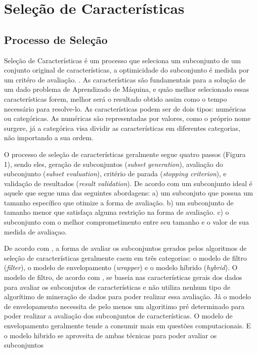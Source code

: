 \chapter[Seleção de Características]{Seleção de Características}

\section{Processo de Seleção}

Seleção de Características é um processo que seleciona um subconjunto de um conjunto original de características, a optimicidade do subconjunto é medida por um critéro de avaliação. \cite{liu_2005}. As características são fundamentais para a solução de um dado problema de Aprendizado de Máquina, e quão melhor selecionado essas características forem, melhor será o resultado obtido assim como o tempo necessário para resolve-lo. As características podem ser de dois tipos: numéricas ou categóricas. As numéricas são representadas por valores, como o próprio nome surgere, já a categórica visa dividir as características em diferentes categorias, não importando a sua ordem. 

O processo de seleção de características geralmente segue quatro passos (Figura 1), sendo eles, geração de subconjuntos (\textit {subset generation}), avaliação do subconjunto (\textit {subset evaluation}), critério de parada (\textit {stopping criterion}), e validação de resultados (\textit {result validation}). De acordo com  um subconjunto ideal é aquele que segue uma das seguintes abordagens: a) um subconjuto que possua um tamanho específico que otimize a forma de avaliação. b) um subconjunto de tamanho menor que satisfaça alguma restrição na forma de avaliação. c) o subconjunto com o melhor comprometimento entre seu tamanho e o valor de sua medida de avaliaçao.

De acordo com , a forma de avaliar os subconjuntos gerados pelos algoritmos de seleção de características geralmente caem em três categorias: o modelo de filtro (\textit {filter}), o modelo de envelopamento (\textit {wrapper}) e o modelo híbrido (\textit {hybrid}). O modelo de filtro, de acordo com , se baseia nas características gerais dos dados para avaliar os subconjutos de características e não utiliza nenhum tipo de algorítimo de mineração de dados para poder realizar essa avaliação. Já o modelo de envelopamento necessita de pelo menos um algoritimo pré determinado para poder realizar a avaliação dos subconjuntos de características. O modelo de envelopamento geralmente tende a consumir mais em questões computacionais. E o modelo hibrido se aproveita de ambas técnicas para poder avaliar os subconjuntos

